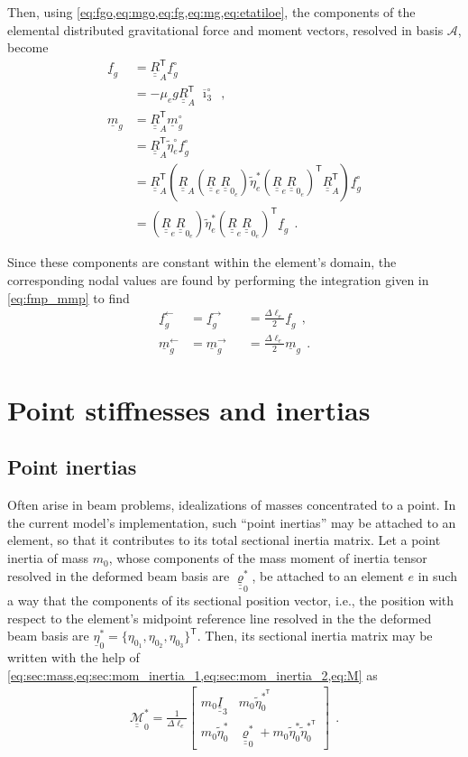 \documentclass[12pt,a4paper,oneside,english]{abntex2} %
\newcommand{\vect}[1]{\underline{#1}}
\newcommand{\uvec}[1]{\overline{#1}}
\def\tens#1{\underline{\underline{#1}}}
\def\til#1{\widetilde{#1}}
\def\lp{\left(}
\def\rp{\right)}
\def\T{\mathsf{T}}
\def\A{\mathcal{A}}
\def\Ithree{\tens{I}_3}
\def\itho{\uvec{\imath}_3^{\circ}}
\def\R{\tens{R}}
\def\RA{\R_A}
\def\RAT{\R^\T_A}
\def\etatilse{\til{\eta}_e^*}
\def\etatiloe{\til{\eta}_e^\circ}
\def\f{\vect{f}}
\def\m{\vect{m}}
\def\Deltal{\Delta \ell_e}
\def\dlotwo{\frac{\Deltal}{2}}
\def\Re{\R_{e}}
\def\Rze{\R_{0_e}}
\def\RRze{\lp\Re\Rze\rp}
\def\RRzeT{\RRze^\T}
\def\Mass{\mathcal{\tens{M}}^*}
\def\fg{\f_g}
\def\mg{\m_g}
\def\fgo{\fg^{\circ}}
\def\mgo{\mg^{\circ}}
\def\g{g}
\begin{document}
\begin{apendicesenv}
Then, using \cref{eq:fgo,eq:mgo,eq:fg,eq:mg,eq:etatiloe}, the components of the elemental distributed gravitational force and moment vectors, resolved in basis $\A$, become
\begin{align}
    \fg &= \RAT\fgo
    \nonumber \\
    &= -\mu_e\g\RAT\;\itho \ \ ,
    \label{eq:fg_final}
    \\
    \mg &= \RAT\mgo
    \nonumber \\
    &= \RAT\etatiloe\fgo
    \nonumber \\
    &= \RAT\lp\RA\RRze\etatilse\RRzeT\RAT\rp\fgo
    \nonumber \\
    &= \RRze\etatilse\RRzeT\fg \ \ .
    \label{eq:mg_final}
\end{align}

Since these components are constant within the element's domain, the corresponding nodal values are found by performing the integration given in \cref{eq:fmp_mmp} to find
\begin{equation}
\begin{alignedat}{2}
    \fg^\leftarrow &= \fg^\rightarrow &&= \dlotwo\fg \ \ ,
    \\
    \mg^\leftarrow &= \mg^\rightarrow &&= \dlotwo\mg \ \ .
    \label{eq:fmg_nodal}
\end{alignedat}
\end{equation}

\section{Point stiffnesses and inertias}

\subsection{Point inertias}
\label{sec:point_masses}

Often arise in beam problems, idealizations of masses concentrated to a point. In the current model's implementation, such ``point inertias'' may be attached to an element, so that it contributes to its total sectional inertia matrix. Let a point inertia of mass $m_{0}$, whose components of the mass moment of inertia tensor resolved in the deformed beam basis are $\tens{\varrho}_{0}^*$, be attached to an element $e$ in such a way that the components of its sectional position vector, i.e., the position with respect to the element's midpoint reference line resolved in the the deformed beam basis are $\vect{\eta}_{0}^* = \{\eta_{0_1},\eta_{0_2},\eta_{0_3}\}^\T$. Then, its sectional inertia matrix may be written with the help of \cref{eq:sec:mass,eq:sec:mom_inertia_1,eq:sec:mom_inertia_2,eq:M} as
\begin{align}
    \Mass_{0} = \frac{1}{\Deltal}
    \begin{bmatrix}
    m_{0}\Ithree & m_{0}\til{\eta}_{0}^{*^\T}\\ 
    m_{0}\til{\eta}_{0}^{*} & \tens{\varrho}_{0}^* + m_{0}\til{\eta}_{0}^{*}\til{\eta}_{0}^{*^\T}
    \end{bmatrix} \ \ .
    \label{eq:M_PM}
\end{align}


\end{apendicesenv}
\end{document}

